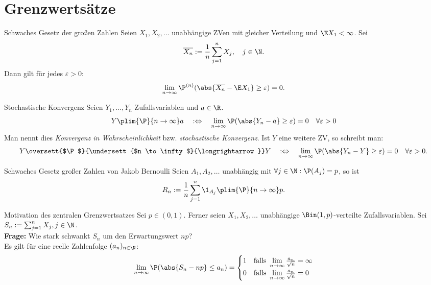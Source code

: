 \section*{Grenzwertsätze}

\begin{karte}{Schwaches Gesetz der großen Zahlen}
	Seien $X_1,X_2,\dotsc$ unabhängige ZVen mit gleicher Verteilung und $\E X_1 < \infty$. Sei 
	$$ \overline{X_n}:=\frac{1}{n}\sum_{j=1}^{n} X_j, \quad j \in \N.$$
	Dann gilt für jedes $\varepsilon > 0$:
	$$\lim\limits_{n \to \infty} \P^{(n)}(\abs{\overline{X_n}-\E X_1} \geq \varepsilon) = 0.$$
\end{karte}

\begin{karte}{Stochastische Konvergenz}
	Seien $Y_1,\dotsc ,Y_n$ Zufallsvariablen und $a \in \R$.
	$$ Y \plim{\P}{n \to \infty} a \quad :\Leftrightarrow \quad \lim\limits_{n \to \infty} \P(\abs{Y_n-a}\geq \varepsilon) = 0 \quad \forall \varepsilon > 0$$
	Man nennt dies \textit{Konvergenz in Wahrscheinlichkeit} bzw. \textit{stochastische Konvergenz}.
	Ist $Y$ eine weitere ZV, so schreibt man:
	$$ Y \oversett{$\P$}{\undersett{$n \to \infty$}{\longrightarrow}} Y \quad :\Leftrightarrow \quad \lim\limits_{n \to \infty} \P(\abs{Y_n-Y}\geq \varepsilon) = 0 \quad \forall \varepsilon > 0.$$
\end{karte}

\begin{karte}{Schwaches Gesetz großer Zahlen von Jakob Bernoulli}
	Seien $A_1,A_2,\dotsc$ unabhängig mit $\forall j \in \N :\P(A_j)=p$, so ist
	$$R_n := \frac{1}{n}\sum_{j=1}^{n}\1_{A_j} \plim{\P}{n \to \infty} p.$$
\end{karte}

\begin{karte}{Motivation des zentralen Grenzwertsatzes}
	Sei $p \in (0,1)$. Ferner seien $X_1,X_2,\dotsc$ unabhängige $\Bin(1,p)$-verteilte Zufallsvariablen. Sei $S_n := \sum_{j=1}^{n}X_j, j \in \N$. \\
	\textbf{Frage:} Wie stark schwankt $S_n$ um den Erwartungswert $np$? \\
	Es gilt für eine reelle Zahlenfolge $(a_n)_{n \in \N}$:
	$$ \lim\limits_{n \to \infty}\P(\abs{S_n-np} \leq a_n) = \begin{cases}
	1 & \text{falls } \lim\limits_{n \to \infty} \frac{a_n}{\sqrt{n}} = \infty \\
	0 & \text{falls } \lim\limits_{n \to \infty} \frac{a_n}{\sqrt{n}} = 0
	\end{cases}$$
\end{karte}

